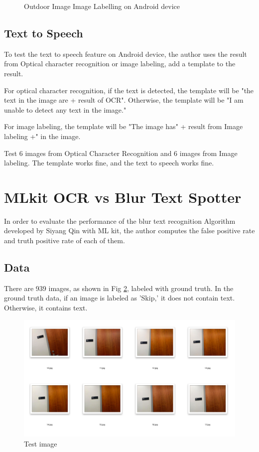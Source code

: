 \documentclass[11pt]{ucscthesis}
\begin{document}
\begin{figure}
  \hfill
\caption{Outdoor Image Image Labelling on Android device}
\label{ImageoutdoorAndroid}
\end{figure}



\subsection{Text to Speech}
To test the text to speech feature on Android device, the author uses the result from Optical character recognition or image labeling, add a template to the result.

For optical character recognition, if the text is detected, the template will be "the text in the image are + result of OCR". Otherwise, the template will be "I am unable to detect any text in the image."

For image labeling, the template will be "The image has" + result from Image labeling +" in the image.

Test 6 images from Optical Character Recognition and 6 images from Image labeling. The template works fine, and the text to speech works fine.


\section{MLkit OCR vs Blur Text Spotter}
In order to evaluate the performance of the blur text recognition Algorithm developed by Siyang Qin with ML kit, the author computes the false positive rate and truth positive rate of each of them.
\subsection{Data}
There are 939 images, as shown in Fig \ref{testimage}, labeled with ground truth. In the ground truth data, if an image is labeled as 'Skip,' it does not contain text. Otherwise, it contains text.
  \begin{figure}
    \centering
    \includegraphics[width =0.8\linewidth]{Fig/TestData.png}
    \caption{Test image }
    \label{testimage}
\end{figure}
 
\end{document}
